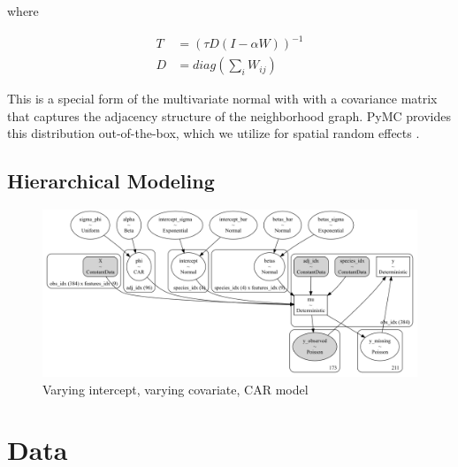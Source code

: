 \documentclass[notitlepage]{article}
\begin{document}
where

\begin{equation}
\begin{aligned}
    T &= (\tau D (I-\alpha W))^{-1} \\
    D &= diag(\sum_{i} W_{ij})
\end{aligned}
\end{equation}


This is a special form of the multivariate normal with with a covariance matrix that captures the adjacency structure of the neighborhood graph. 
PyMC provides this distribution out-of-the-box, which we utilize for spatial random effects \cite{salvatier_probabilistic_2016}.


\subsection{Hierarchical Modeling}

\begin{figure}[hbt!]
\centering
\includegraphics[width=\textwidth]{report/figures/full_model.png}
\caption{Varying intercept, varying covariate, CAR model}
\end{figure}

\section{Data}
\end{document}
